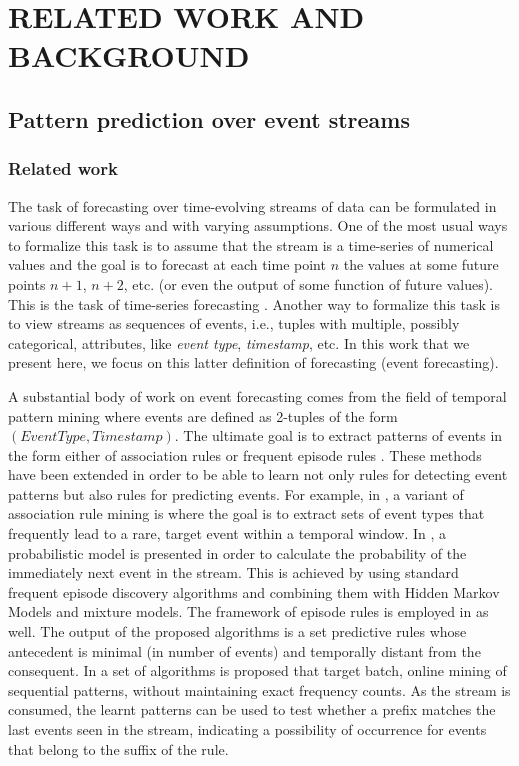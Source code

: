 \section{RELATED WORK AND BACKGROUND}

\subsection{Pattern prediction over event streams}


\subsubsection*{Related work}
The task of forecasting over time-evolving streams of data can be formulated in various different ways and with varying assumptions.
One of the most usual ways to formalize this task is to assume that the stream is a time-series of numerical values and the goal is to forecast at each time point $n$ the values at some future points $n+1$, $n+2$, etc. (or even the output of some function of future values). 
This is the task of time-series forecasting \cite{montgomery_introduction_2015}.
Another way to formalize this task is to view streams as sequences of events,
i.e., tuples with multiple, possibly categorical, attributes, like \textit{event type}, \textit{timestamp}, etc. 
In this work that we present here, 
we focus on this latter definition of forecasting (event forecasting).  

A substantial body of work on event forecasting comes from the field of temporal pattern mining where events are defined as 2-tuples of the form $(\mathit{EventType},\mathit{Timestamp})$.
The ultimate goal is to extract patterns of events in the form either of association rules \cite{agrawal_mining_1993} or frequent episode rules \cite{mannila_discovery_1997}. 
These methods have been extended in order to be able to learn not only rules for detecting event patterns but also rules for predicting events.
For example, in \cite{vilalta_predicting_2002}, a variant of association rule mining is where the goal is to extract sets of event types that frequently lead to a rare, target event within a temporal window. 
In \cite{laxman_stream_2008}, a probabilistic model is presented
in order to calculate the probability of the immediately next event in the stream. 
This is achieved by using standard frequent episode discovery algorithms and combining them with Hidden Markov Models and mixture models.
The framework of episode rules is employed in \cite{fahed_efficient_2014} as well.
The output of the proposed algorithms is a set predictive rules whose antecedent is minimal (in number of events) and temporally distant from the consequent.
In \cite{zhou_pattern_2015} a set of algorithms is proposed that target batch, online mining of sequential patterns, without maintaining exact frequency counts.
As the stream is consumed, the learnt patterns can be used to test whether a prefix matches the last events seen in the stream, 
indicating a possibility of occurrence for events that belong to the suffix of the rule.

